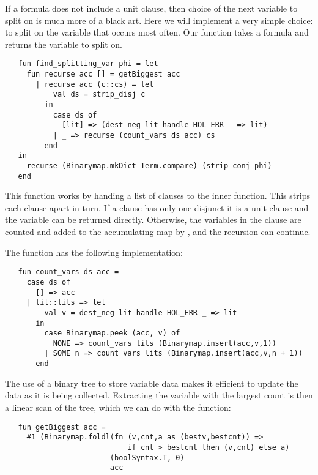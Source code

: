 If a formula does not include a unit clause, then choice of the next
variable to split on is much more of a black art.  Here we will
implement a very simple choice: to split on the variable that occurs
most often.  Our function  takes a formula
and returns the variable to split on.
\begin{hol}
\begin{verbatim}
   fun find_splitting_var phi = let
     fun recurse acc [] = getBiggest acc
       | recurse acc (c::cs) = let
           val ds = strip_disj c
         in
           case ds of
             [lit] => (dest_neg lit handle HOL_ERR _ => lit)
           | _ => recurse (count_vars ds acc) cs
         end
   in
     recurse (Binarymap.mkDict Term.compare) (strip_conj phi)
   end
\end{verbatim}
\end{hol}
This function works by handing a list of clauses to the inner
 function.  This strips each clause apart in turn.  If a
clause has only one disjunct it is a unit-clause and the variable can
be returned directly.  Otherwise, the variables in the clause are
counted and added to the accumulating map by , and the
recursion can continue.

The  function has the following implementation:
\begin{hol}
\begin{verbatim}
   fun count_vars ds acc =
     case ds of
       [] => acc
     | lit::lits => let
         val v = dest_neg lit handle HOL_ERR _ => lit
       in
         case Binarymap.peek (acc, v) of
           NONE => count_vars lits (Binarymap.insert(acc,v,1))
         | SOME n => count_vars lits (Binarymap.insert(acc,v,n + 1))
       end
\end{verbatim}
\end{hol}

The use of a binary tree to store variable data makes it efficient to
update the data as it is being collected.  Extracting the variable
with the largest count is then a linear scan of the tree, which we can
do with the  function:
\begin{hol}
\begin{verbatim}
   fun getBiggest acc =
     #1 (Binarymap.foldl(fn (v,cnt,a as (bestv,bestcnt)) =>
                            if cnt > bestcnt then (v,cnt) else a)
                        (boolSyntax.T, 0)
                        acc
\end{verbatim}
\end{hol}

